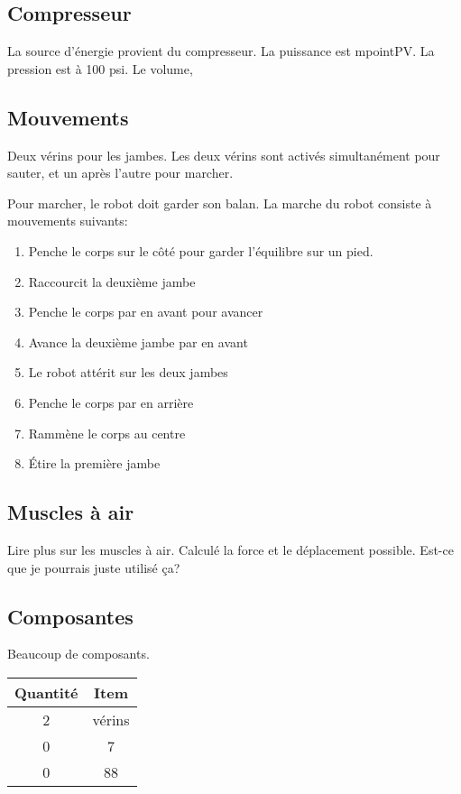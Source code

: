 \documentclass{article}
\begin{document}
\subsection{Compresseur}

La source d'énergie provient du compresseur. La puissance est mpointPV. La pression est à 100 psi. Le volume, 

\subsection{Mouvements}

Deux vérins pour les jambes. Les deux vérins sont activés simultanément pour sauter, et un après l'autre pour marcher.

Pour marcher, le robot doit garder son balan.
La marche du robot consiste à mouvements suivants:
\begin{enumerate}
    \item Penche le corps sur le côté pour garder l'équilibre sur un pied.
    \item Raccourcit la deuxième jambe
    \item Penche le corps par en avant pour avancer
    \item Avance la deuxième jambe par en avant
    \item Le robot attérit sur les deux jambes
    \item Penche le corps par en arrière
    \item Rammène le corps au centre
    \item Étire la première jambe
\end{enumerate}

\subsection{Muscles à air}

Lire plus sur les muscles à air. Calculé la force et le déplacement possible. Est-ce que je pourrais juste utilisé ça?

\subsection{Composantes}

Beaucoup de composants.

\begin{table}[h!]
\begin{tabular}{|c | c|} 
 \hline
 Quantité & Item \\ [0.5ex] 
 \hline
 2 & vérins \\ 
 0 & 7 \\
 0 & 88 \\ [1ex] 
 \hline
\end{tabular}
\label{table:nomDeRef}
\end{table}
\end{document}
